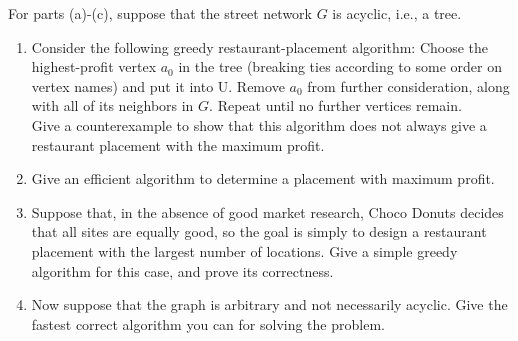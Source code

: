 \documentclass[12pt]{amsart}
\begin{document}
For parts (a)-(c), suppose that the street network $G$ is acyclic, i.e., a tree.
\begin{enumerate}[label=(\alph*)]
\item Consider the following greedy restaurant-placement algorithm: Choose the highest-profit vertex $a_0$ in the tree (breaking ties according to some order on vertex names) and put it into U. Remove $a_0$ from further consideration, along with all of its neighbors in $G$. Repeat until no further vertices remain.
\\

Give a counterexample to show that this algorithm does not always give a restaurant
placement with the maximum profit. 
\\

\item Give an efficient algorithm to determine a placement with maximum profit.
\\

\item Suppose that, in the absence of good market research, Choco Donuts decides that all sites are
equally good, so the goal is simply to design a restaurant placement with the largest number of locations. Give a simple greedy algorithm for this case, and prove its correctness. 
\\

\item Now suppose that the graph is arbitrary and not necessarily acyclic. Give the fastest correct algorithm you can for solving the problem. 
\end{enumerate}
\end{document}
